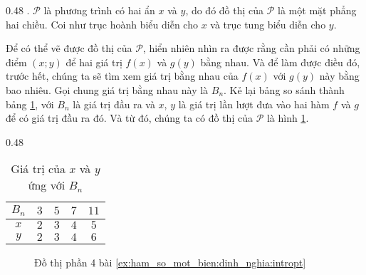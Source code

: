 {
   \begin{minipageindent}{0.48\textwidth}
. $\mathcal{P}$ là phương trình có hai ẩn $x$ và $y$, do đó đồ thị của $\mathcal{P}$ là một mặt phẳng hai chiều. Coi như trục hoành biểu diễn cho $x$ và trục tung biểu diễn cho $y$. 

      Để có thể vẽ được đồ thị của $\mathcal{P}$, hiển nhiên nhìn ra được rằng cần phải có những điểm $(x;y)$ để hai giá trị $f(x)$ và $g(y)$ bằng nhau. Và để làm được điều đó, trước hết, chúng ta sẽ tìm xem giá trị bằng nhau của $f(x)$ với $g(y)$ này bằng bao nhiêu. Gọi chung giá trị bằng nhau này là $B_n$. Kẻ lại bảng so sánh thành bảng \ref{tab:ham_so_mot_bien:dinh_nghia:bn_values}, với $B_n$ là giá trị đầu ra và $x$, $y$ là giá trị lần lượt đưa vào hai hàm $f$ và $g$ để có giá trị đầu ra đó. Và từ đó, chúng ta có đồ thị của $\mathcal{P}$ là hình \ref{fig:ham_so_mot_bien:dinh_nghia:dtp4}.
   \end{minipageindent}
   \hfill
   \begin{minipageindent}{0.48\textwidth}
      \begin{table}[H]
         \centering
         \begin{tabular}{|c|c|c|c|c|}
            \hline
            $B_n$ & $3$ & $5$ & $7$ & $11$ \\
            \hline
            $x$ & $2$ & $3$ & $4$ & $5$ \\
            \hline
            $y$ & $2$ & $3$ & $4$ & $6$ \\
            \hline 
         \end{tabular}
         \caption{Giá trị của $x$ và $y$ ứng với $B_n$}
         \label{tab:ham_so_mot_bien:dinh_nghia:bn_values}
      \end{table}
   \end{minipageindent}
}

\begin{figure}[H]
   \centering
   \caption{Đồ thị phần 4 bài \ref{ex:ham_so_mot_bien:dinh_nghia:intropt}}
   \label{fig:ham_so_mot_bien:dinh_nghia:dtp4}
\end{figure}

